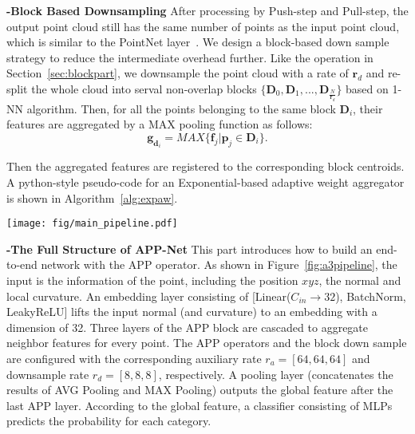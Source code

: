 \documentclass[journal]{IEEEtran}
\begin{document}
\noindent
{\bf -Block Based Downsampling}
After processing by Push-step and Pull-step, the output point cloud still has the same number of points as the input point cloud, which is similar to the PointNet layer~\cite{PointNet}. We design a block-based down sample strategy to reduce the intermediate overhead further. Like the operation in Section~\ref{sec:blockpart}, we downsample the point cloud with a rate of $\mathbf{r}_d$ and re-split the whole cloud into serval non-overlap blocks $\{\mathbf{D}_0, \mathbf{D}_1, ..., \mathbf{D}_{\frac{N}{\mathbf{r}_d}}\}$ based on 1-NN algorithm. Then, for all the points belonging to the same block $\mathbf{D}_i$, their features are aggregated by a MAX pooling function as follows:
\begin{equation}
\mathbf{g}_{\mathbf{d}_i} = MAX\{\mathbf{f}_j|\mathbf{p}_j\in \mathbf{D}_i\}.
\end{equation}



\noindent
Then the aggregated features are registered to the corresponding block centroids. A python-style pseudo-code for an Exponential-based adaptive weight aggregator is shown in Algorithm~\ref{alg:expaw}.





\begin{figure*}[tbp]
\begin{center}
\texttt{[image: fig/main\_pipeline.pdf]}
\end{center}
\caption{The whole structure of the proposed APP-Net. The channel of normal estimation is 3 or 4, which corresponds to whether to use the curvature.}
   \label{fig:a3pipeline}
\end{figure*}

\noindent
{\bf -The Full Structure of APP-Net}
This part introduces how to build an end-to-end network with the APP operator. As shown in Figure~\ref{fig:a3pipeline}, the input is the information of the point, including the position $xyz$, the normal and local curvature. An embedding layer consisting of [Linear($C_{in}\to32$), BatchNorm, LeakyReLU] lifts the input normal (and curvature) to an embedding with a dimension of 32. Three layers of the APP block are cascaded to aggregate neighbor features for every point. The APP operators and the block down sample are configured with the corresponding auxiliary rate $r_a=[64,64,64]$ and downsample rate $r_d=[8,8,8]$, respectively. A pooling layer (concatenates the results of AVG Pooling and MAX Pooling) outputs the global feature after the last APP layer. According to the global feature, a classifier consisting of MLPs predicts the probability for each category. 
\end{document}
